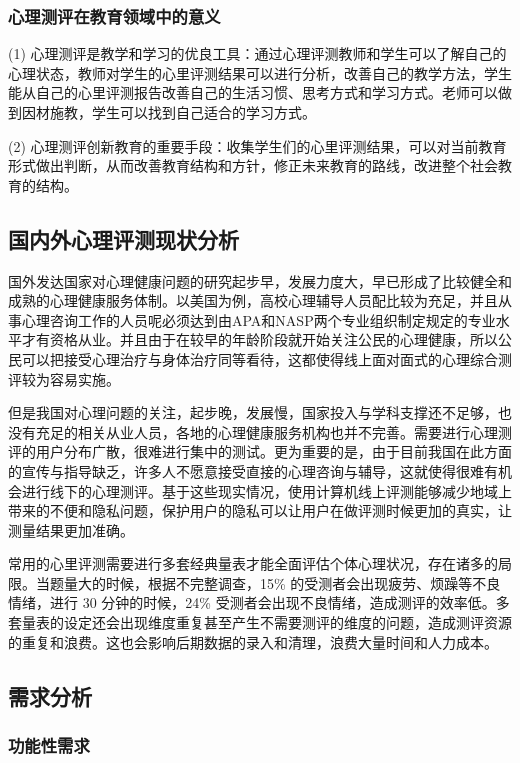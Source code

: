 \subsubsection{心理测评在教育领域中的意义}

(1) 心理测评是教学和学习的优良工具：通过心理评测教师和学生可以了解自己的心理状态，教师对学生的心里评测结果可以进行分析，改善自己的教学方法，学生能从自己的心里评测报告改善自己的生活习惯、思考方式和学习方式。老师可以做到因材施教，学生可以找到自己适合的学习方式。

(2) 心理测评创新教育的重要手段：收集学生们的心里评测结果，可以对当前教育形式做出判断，从而改善教育结构和方针，修正未来教育的路线，改进整个社会教育的结构。

\subsection{国内外心理评测现状分析}

国外发达国家对心理健康问题的研究起步早，发展力度大，早已形成了比较健全和成熟的心理健康服务体制。以美国为例，高校心理辅导人员配比较为充足，并且从事心理咨询工作的人员呢必须达到由APA和NASP两个专业组织制定规定的专业水平才有资格从业。并且由于在较早的年龄阶段就开始关注公民的心理健康，所以公民可以把接受心理治疗与身体治疗同等看待，这都使得线上面对面式的心理综合测评较为容易实施。

但是我国对心理问题的关注，起步晚，发展慢，国家投入与学科支撑还不足够，也没有充足的相关从业人员，各地的心理健康服务机构也并不完善。需要进行心理测评的用户分布广散，很难进行集中的测试。更为重要的是，由于目前我国在此方面的宣传与指导缺乏，许多人不愿意接受直接的心理咨询与辅导，这就使得很难有机会进行线下的心理测评。基于这些现实情况，使用计算机线上评测能够减少地域上带来的不便和隐私问题，保护用户的隐私可以让用户在做评测时候更加的真实，让测量结果更加准确。

常用的心里评测需要进行多套经典量表才能全面评估个体心理状况，存在诸多的局限。当题量大的时候，根据不完整调查，15\% 的受测者会出现疲劳、烦躁等不良情绪，进行 30 分钟的时候，24\% 受测者会出现不良情绪，造成测评的效率低。多套量表的设定还会出现维度重复甚至产生不需要测评的维度的问题，造成测评资源的重复和浪费。这也会影响后期数据的录入和清理，浪费大量时间和人力成本。

\subsection{需求分析}

\subsubsection{功能性需求}

